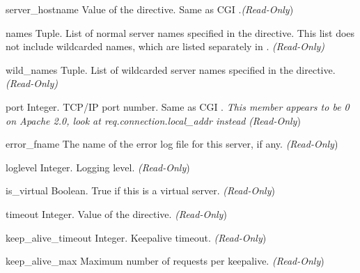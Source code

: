 \begin{memberdesc}[server]{server_hostname}
  Value of the  directive. Same as CGI .\emph{(Read-Only})
\end{memberdesc}

\begin{memberdesc}[server]{names}
  Tuple. List of normal server names specified in the  
  directive.  This list does not include wildcarded names, which are listed
  separately in . \emph{(Read-Only)}
\end{memberdesc}

\begin{memberdesc}[server]{wild_names}
  Tuple. List of wildcarded server names specified in the 
  directive. \emph{(Read-Only)}
\end{memberdesc}

\begin{memberdesc}[server]{port}
  Integer. TCP/IP port number. Same as CGI .
  \emph{This member appears to be 0 on Apache 2.0, look at req.connection.local_addr instead}
  \emph{(Read-Only})
\end{memberdesc}

\begin{memberdesc}[server]{error_fname}
  The name of the error log file for this server, if any.
  \emph{(Read-Only})
\end{memberdesc}

\begin{memberdesc}[server]{loglevel}
  Integer. Logging level.
  \emph{(Read-Only})
\end{memberdesc}

\begin{memberdesc}[server]{is_virtual}
  Boolean. True if this is a virtual server.
  \emph{(Read-Only})
\end{memberdesc}

\begin{memberdesc}[server]{timeout}
  Integer. Value of the  directive.
  \emph{(Read-Only})
\end{memberdesc}

\begin{memberdesc}[server]{keep_alive_timeout}
  Integer. Keepalive timeout.
  \emph{(Read-Only})
\end{memberdesc}

\begin{memberdesc}[server]{keep_alive_max}
  Maximum number of requests per keepalive.
  \emph{(Read-Only})
\end{memberdesc}

